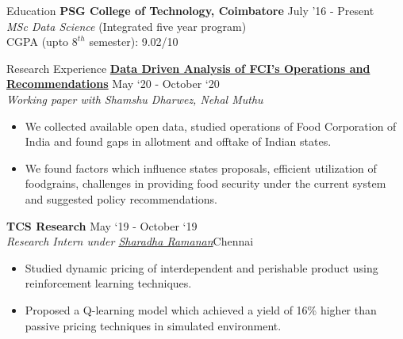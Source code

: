 \documentclass{resume} %
\begin{document}
\begin{rSection}{Education}
\vspace*{0.1in}
{\bf PSG College of Technology, Coimbatore} \hfill {July '16 - Present} \\ {\emph{MSc Data Science} (Integrated  five year program)} \\
CGPA (upto $8^{th}$ semester): 9.02/10
\end{rSection}
\begin{rSection}{Research Experience}
\vspace*{0.1in}
{\bf \href{https://arunpalaniappan.github.io/files/FCI.pdf}{Data Driven Analysis of FCI’s Operations and Recommendations}} { \hfill May `20 - October `20}\\
\textit{Working paper with Shamshu Dharwez, Nehal Muthu}
\begin{itemize}
\item We collected available open data, studied operations of Food Corporation of India and found gaps in allotment and offtake of Indian states.
\item We found factors which influence states proposals, efficient utilization of foodgrains, challenges in providing food security under the current system and suggested policy recommendations.
\end{itemize}

{\bf TCS Research} { \hfill May `19 - October `19}\\
\textit{Research Intern under \href{https://www.linkedin.com/in/sharadha-ramanan-43bb4946/}{Sharadha Ramanan}}{\hfill Chennai}
\begin{itemize}
\item Studied dynamic pricing of interdependent and perishable product using reinforcement learning techniques.
\item Proposed a Q-learning model which achieved a yield of 16\% higher than passive pricing techniques in simulated environment.
\end{itemize}
\end{rSection}
\end{document}
